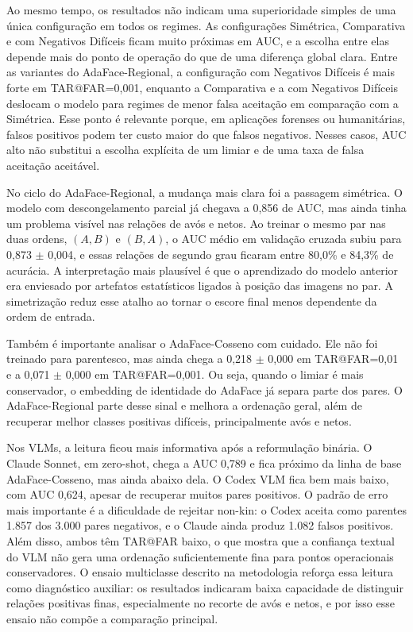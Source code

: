 Ao mesmo tempo, os resultados não indicam uma superioridade simples de uma única configuração em todos os regimes. As configurações Simétrica, Comparativa e com Negativos Difíceis ficam muito próximas em AUC, e a escolha entre elas depende mais do ponto de operação do que de uma diferença global clara. Entre as variantes do AdaFace-Regional, a configuração com Negativos Difíceis é mais forte em TAR@FAR=0,001, enquanto a Comparativa e a com Negativos Difíceis deslocam o modelo para regimes de menor falsa aceitação em comparação com a Simétrica. Esse ponto é relevante porque, em aplicações forenses ou humanitárias, falsos positivos podem ter custo maior do que falsos negativos. Nesses casos, AUC alto não substitui a escolha explícita de um limiar e de uma taxa de falsa aceitação aceitável.

No ciclo do AdaFace-Regional, a mudança mais clara foi a passagem simétrica. O modelo com descongelamento parcial já chegava a 0,856 de AUC, mas ainda tinha um problema visível nas relações de avós e netos. Ao treinar o mesmo par nas duas ordens, $(A,B)$ e $(B,A)$, o AUC médio em validação cruzada subiu para 0,873 $\pm$ 0,004, e essas relações de segundo grau ficaram entre 80,0\% e 84,3\% de acurácia. A interpretação mais plausível é que o aprendizado do modelo anterior era enviesado por artefatos estatísticos ligados à posição das imagens no par. A simetrização reduz esse atalho ao tornar o escore final menos dependente da ordem de entrada.

Também é importante analisar o AdaFace-Cosseno com cuidado. Ele não foi treinado para parentesco, mas ainda chega a 0,218 $\pm$ 0,000 em TAR@FAR=0,01 e a 0,071 $\pm$ 0,000 em TAR@FAR=0,001. Ou seja, quando o limiar é mais conservador, o embedding de identidade do AdaFace já separa parte dos pares. O AdaFace-Regional parte desse sinal e melhora a ordenação geral, além de recuperar melhor classes positivas difíceis, principalmente avós e netos.

Nos VLMs, a leitura ficou mais informativa após a reformulação binária. O Claude Sonnet, em zero-shot, chega a AUC 0,789 e fica próximo da linha de base AdaFace-Cosseno, mas ainda abaixo dela. O Codex VLM fica bem mais baixo, com AUC 0,624, apesar de recuperar muitos pares positivos. O padrão de erro mais importante é a dificuldade de rejeitar non-kin: o Codex aceita como parentes 1.857 dos 3.000 pares negativos, e o Claude ainda produz 1.082 falsos positivos. Além disso, ambos têm TAR@FAR baixo, o que mostra que a confiança textual do VLM não gera uma ordenação suficientemente fina para pontos operacionais conservadores. O ensaio multiclasse descrito na metodologia reforça essa leitura como diagnóstico auxiliar: os resultados indicaram baixa capacidade de distinguir relações positivas finas, especialmente no recorte de avós e netos, e por isso esse ensaio não compõe a comparação principal.

